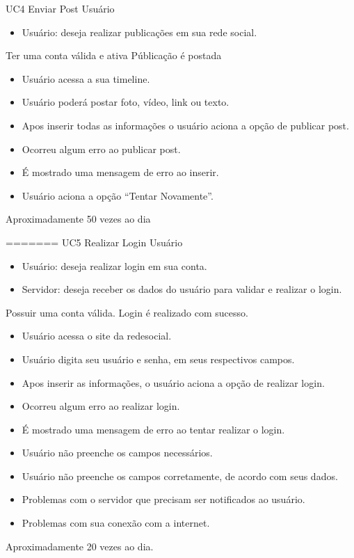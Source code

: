 \casoDeUso
{UC4}
{Enviar Post}
{Usuário}
{
\begin{itemize}
	\item Usuário: deseja realizar publicações em sua rede social.
\end{itemize}

}
{Ter uma conta válida e ativa}
{Públicação é postada}
{
\begin{itemize}
\item Usuário acessa a sua timeline.
\item Usuário poderá postar foto, vídeo, link ou texto.
\item Apos inserir todas as informações o usuário aciona a opção de publicar post.
\end{itemize}
}
{
\begin{itemize}
\item Ocorreu algum erro ao publicar post.
\item É mostrado uma mensagem de erro ao inserir.
\item Usuário aciona a opção “Tentar Novamente”.
\end{itemize}
}
{Aproximadamente 50 vezes ao dia}
{

}
=======
\casoDeUso
{UC5}
{Realizar Login}
{Usuário}
{
\begin{itemize}
	\item Usuário: deseja realizar login em sua conta.
	\item Servidor: deseja receber os dados do usuário para validar e realizar o login.
\end{itemize}

}
{Possuir uma conta válida.}
{Login é realizado com sucesso.}
{
\begin{itemize}
\item Usuário acessa o site da redesocial.
\item Usuário digita seu usuário e senha, em seus respectivos campos.
\item Apos inserir as informações, o usuário aciona a opção de realizar login.
\end{itemize}
}
{
\begin{itemize}
\item Ocorreu algum erro ao realizar login.
\item É mostrado uma mensagem de erro ao tentar realizar o login.
\item Usuário não preenche os campos necessários.
\item Usuário não preenche os campos corretamente, de acordo com seus dados.
\item Problemas com o servidor que precisam ser notificados ao usuário.
\item Problemas com sua conexão com a internet.
\end{itemize}
}
{Aproximadamente 20 vezes ao dia.}
{

}
